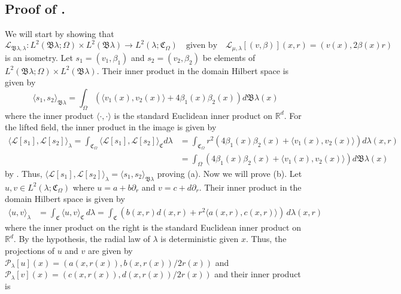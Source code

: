 \documentclass[11pt]{article}
\begin{document}
\subsection{Proof of .} \label{sec: proof of isometry}
We will start by showing that 
\[\mathcal{L}_{\mathfrak{B}\lambda, \lambda}: L^2(\mathfrak{B}\lambda; \Omega) \times L^2(\mathfrak{B}\lambda) \rightarrow L^2(\lambda; \mathfrak{C}_\Omega) \quad \text{given by} \quad \mathcal{L}_{\mu, \lambda}[(v, \beta)](x,r) = (v(x), 2\beta(x)r)\]
is an isometry. Let $s_1 = (v_1, \beta_1)$ and $s_2 = (v_2, \beta_2)$ be elements of $L^2(\mathfrak{B}\lambda; \Omega) \times L^2(\mathfrak{B}\lambda)$. Their inner product in the domain Hilbert space is given by 
\[\langle s_1, s_2\rangle_{\mathfrak{B}\lambda} = \int_{\Omega}\left( \langle v_1(x), v_2(x)\rangle + 4\beta_1(x)\beta_2(x)\right)d\mathfrak{B}\lambda(x) \]
where the inner product $\langle\cdot, \cdot\rangle$ is the standard Euclidean inner product on $\mathbb{R}^d$. For the lifted field, the inner product in the image is given by
\begin{align*}\langle \mathcal{L}[s_1], \mathcal{L}[s_2]\rangle_{\lambda} = \int_{\mathfrak{C}_\Omega} \langle \mathcal{L}[s_1], \mathcal{L}[s_2]\rangle_{\mathfrak{C}} d\lambda &= \int_{\mathfrak{C}_\Omega}r^2\left(4\beta_1(x)\beta_2(x) + \langle v_1(x), v_2(x) \rangle\right)d\lambda(x,r) \\
&= \int_\Omega \left(4\beta_1(x)\beta_2(x) + \langle v_1(x), v_2(x) \rangle\right)d\mathfrak{B}\lambda(x)
\end{align*}
by . Thus, $\langle \mathcal{L}[s_1], \mathcal{L}[s_2]\rangle_{\lambda} = \langle s_1, s_2\rangle_{\mathfrak{B}\lambda}$ proving (a). Now we will prove (b). Let $u, v \in L^2(\lambda; \mathfrak{C}_\Omega)$ where $u = a + b\partial_r$ and $v = c + d\partial_r$. Their inner product in the domain Hilbert space is given by
\begin{align*}
    \langle u, v\rangle_{\lambda} &= \int_{\mathfrak{C}} \langle u, v \rangle_{\mathfrak{C}}\,d\lambda = \int_{\mathfrak{C}} \left(b(x,r)d(x,r) + r^2\langle a(x,r), c(x,r)\rangle \right)\,d\lambda(x,r)
\end{align*}
where the inner product on the right is the standard Euclidean inner product on $\mathbb{R}^d$. By the hypothesis, the radial law of $\lambda$ is deterministic given $x$. Thus, the projections of $u$ and $v$ are given by $\mathcal{P}_{\lambda}[u](x) = (a(x,r(x)), b(x,r(x))/2r(x))$ and $\mathcal{P}_{\lambda}[v](x) = (c(x,r(x)), d(x,r(x))/2r(x))$ and their inner product is
\end{document}
